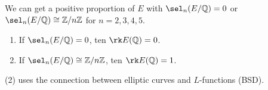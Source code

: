 We can get a positive proportion of $E$ with $\sel_{n}(E/\mathbb{Q})=0$ or $\sel_{n}(E/\mathbb{Q}) \cong \mathbb{Z}/n\mathbb{Z}$ for $n=2,3,4,5$.
\begin{theorem}
\begin{enumerate}[\upshape (1)]
\item If $\sel_{n}(E/\mathbb{Q})=0$, ten $\rk E(\mathbb{Q})=0$.
\item If $\sel_{n}(E/\mathbb{Q}) \cong \mathbb{Z}/n\mathbb{Z}$, ten $\rk E(\mathbb{Q})=1$.
\end{enumerate}
\end{theorem}
(2) uses the connection between elliptic curves and $L$-functions (BSD).